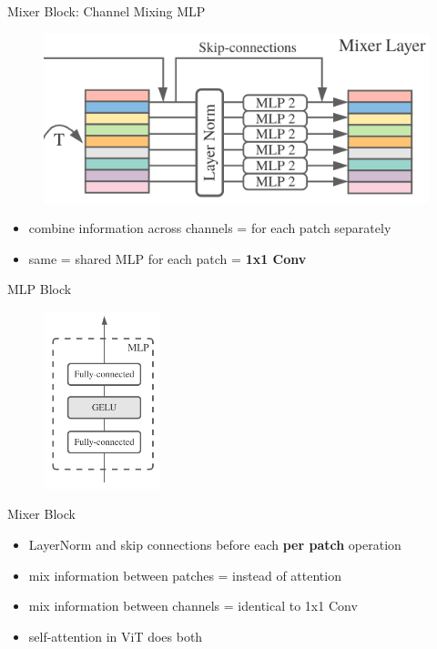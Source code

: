 \documentclass{beamer}
\begin{document}
\begin{frame}{Mixer Block: Channel Mixing MLP}

\begin{figure}[h]
\includegraphics[width=\textwidth]{img/mlp2}
\end{figure}

\begin{itemize}
\item combine information across channels = for each patch separately
\item same = shared MLP for each patch = \textbf{1x1 Conv}
\end{itemize}

\end{frame}
\begin{frame}{MLP Block}

\begin{figure}[h]
\includegraphics[width=0.3\textwidth]{img/mlp}
\end{figure}

\end{frame}
\begin{frame}{Mixer Block}

\begin{itemize}
\item LayerNorm and skip connections before each \textbf{per patch} operation

\vfill

\item mix information between patches = instead of attention
\item mix information between channels = identical to 1x1 Conv
\item self-attention in ViT does both
\end{itemize}


\end{frame}
\end{document}
